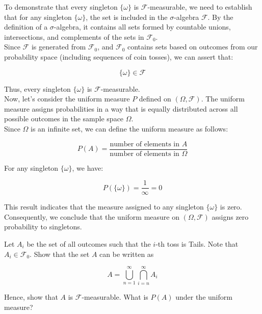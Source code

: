 \begin{solution}
    To demonstrate that every singleton \( \{\omega\} \) is \( \mathcal{F} \)-measurable, we need to establish that for any singleton \( \{\omega\} \), the set is included in the \( \sigma \)-algebra \( \mathcal{F} \). By the definition of a \( \sigma \)-algebra, it contains all sets formed by countable unions, intersections, and complements of the sets in \( \mathcal{F}_0 \).\\

    Since \( \mathcal{F} \) is generated from \( \mathcal{F}_0 \), and \( \mathcal{F}_0 \) contains sets based on outcomes from our probability space (including sequences of coin tosses), we can assert that:
    
    \[
    \{\omega\} \in \mathcal{F}
    \]
    
    Thus, every singleton \( \{\omega\} \) is \( \mathcal{F} \)-measurable.\\
    
    Now, let's consider the uniform measure \( P \) defined on \( (\Omega, \mathcal{F}) \). The uniform measure assigns probabilities in a way that is equally distributed across all possible outcomes in the sample space \( \Omega \).\\
    
    Since \( \Omega \) is an infinite set, we can define the uniform measure as follows:
    
    \[
    P(A) = \frac{\text{number of elements in } A}{\text{number of elements in } \Omega}
    \]
    
    For any singleton \( \{\omega\} \), we have:
    
    \[
    P(\{\omega\}) = \frac{1}{\infty} = 0
    \]
    
    This result indicates that the measure assigned to any singleton \( \{\omega\} \) is zero. Consequently, we conclude that the uniform measure on \( (\Omega, \mathcal{F}) \) assigns zero probability to singletons.
\end{solution}

\begin{exercise}
Let \( A_i \) be the set of all outcomes such that the \( i \)-th toss is Tails. Note that \( A_i \in \mathcal{F}_0 \). Show that the set \( A \) can be written as

\[
A = \bigcup_{n=1}^{\infty} \bigcap_{i=n}^{\infty} A_i 
\]

Hence, show that \( A \) is \( \mathcal{F} \)-measurable. What is \( P(A) \) under the uniform measure?
\end{exercise}

